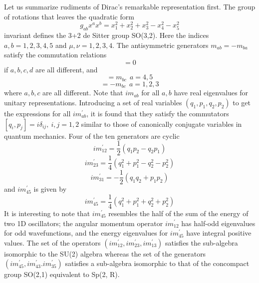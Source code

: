 \documentclass[aps, singlecolumn, showpacs]{revtex4-2}
\begin{document}
Let us summarize rudiments of Dirac's remarkable representation  first. The group of rotations that leaves the quadratic form
\begin{equation}
g_{ab} x^a x^b = x_1^2 +x_2^2 + x_3^2 - x_4^2 - x_5^2
\end{equation}
invariant defines the 3+2 de Sitter group SO(3,2). Here the indices $a, b = 1,2,3,4,5$ and $\mu, \nu =1,2,3,4$. The antisymmetric generators  $m_{ab}=-m_{ba}$ satisfy the commutation relations
\begin{equation}
[m_{ab}, m_{cd}] =0
\end{equation}
if $a,b,c,d$ are all different, and
\begin{equation}
[m_{ab}, m_{ac}] =m_{bc} ~ ~ a=4,5
\end{equation}
\begin{equation}
[m_{ab}, m_{ac}] = -m_{bc} ~~ a=1,2,3
\end{equation}
where $a,b,c$ are all different. Note that $i m_{ab}$ for all $a,b$ have real eigenvalues for unitary representations.  Introducing a set of real variables $(q_1, p_1, q_2, p_2)$ to get the expressions for all $i m^\prime_{ab}$, it is found that they satisfy the commutators $[q_i, p_j] =i \delta_{ij}, ~i,j =1,2$ similar to those of canonically conjugate variables in quantum mechanics.  Four of the ten generators are cyclic
\begin{equation}
i m^\prime_{12} = \frac{1}{2} (q_1 p_2 - q_2 p_1)
\end{equation}
\begin{equation}
i m^\prime_{23} = \frac{1}{4} (q_1^2 + p_1^2 - q_2^2  -p_2^2)
\end{equation}
\begin{equation}
i m^\prime_{31} = -\frac{1}{2}(q_1 q_2 + p_1 p_2)
\end{equation}
and $i m^\prime_{45}$ is given by 
\begin{equation}
i m^\prime_{45} = \frac{1}{4} (q_1^2 + p_1^2 +q_2^2+p_2^2)
\end{equation}
It is interesting to note that $i m^\prime_{45}$ resembles the half of the sum of the energy of two 1D oscillators; the angular momentum operator $i m^\prime_{12}$ has half-odd eigenvalues for odd wavefunctions, and the energy eigenvalues for $i m^\prime_{45}$ have integral positive values. The set of the operators $(i m^\prime_{12}, im^\prime_{23}, i m^\prime_{13})$ satisfies the sub-algebra isomorphic to the SU(2) algebra whereas the set of the generators $(i m^\prime_{45}, i m^\prime_{43}. i m^\prime_{35})$ satisfies a sub-algebra isomorphic to that of the concompact group SO(2,1) equivalent to Sp(2, R).  
\end{document}
